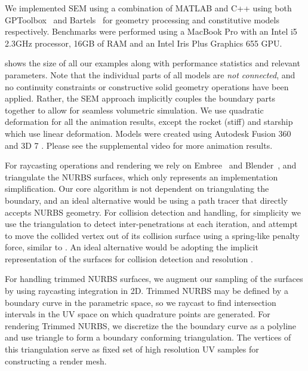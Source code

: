 We implemented SEM using a combination of MATLAB and C++ using both GPToolbox~\cite{gptoolbox} and Bartels~\cite{bartels} for geometry processing and constitutive models 
respectively. Benchmarks were performed using a MacBook Pro with an Intel i5 2.3GHz processor, 16GB of RAM and an Intel Iris Plus Graphics 655 GPU.

 shows the size of all our examples along with performance statistics and relevant parameters. 
Note that the individual parts of all models are \emph{not connected}, and no continuity constraints or constructive solid geometry operations have been applied. 
Rather, the SEM approach implicitly couples the boundary parts together to allow for seamless volumetric simulation. 
We use quadratic deformation for all the animation results, except the rocket (stiff) and starship which use linear deformation.
Models were created using Autodesk Fusion 360 \cite{AutodeskFusion360} and  3D 7 \cite{mcneel-rhinoceros}. 
Please see the supplemental video for more animation results.
  
For raycasting operations and rendering we rely on Embree~\cite{10.1145/2601097.2601199} and Blender~\cite{blender}, and triangulate the NURBS surfaces, which only represents an implementation simplification. 
Our core algorithm is not dependent on triangulating the boundary, and an ideal alternative would be using a path tracer that directly accepts NURBS geometry.
For collision detection and handling, for simplicity we use the triangulation to detect inter-penetrations at each iteration, and attempt to move the collided vertex out of its collision surface using a spring-like penalty force, similar to \cite{10.1145/3355089.3356486, 10.1145/2010324.1964932}.
An ideal alternative would be adopting the implicit representation of the surfaces for collision detection and resolution \cite{10.1145/1516522.1516523, 10.1145/3306346.3323010}. 

For handling trimmed NURBS surfaces, we augment our sampling of the surfaces by using raycasting integration in 2D. Trimmed NURBS may be defined by a boundary curve in the parametric space, so we raycast to find intersection intervals in the UV space on which quadrature points are generated. For rendering Trimmed NURBS, we discretize the the boundary curve as a polyline and use triangle \cite{shewchuk96b, SHEWCHUK200221} to form a boundary conforming triangulation. The vertices of this triangulation serve as fixed set of high resolution UV samples for constructing a render mesh.


